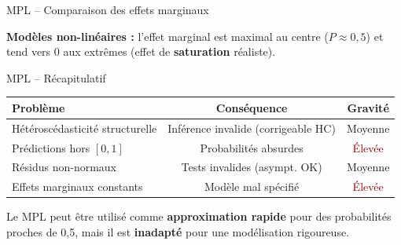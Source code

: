 \documentclass[11pt,aspectratio=169]{beamer}
\begin{document}
\begin{frame}{MPL -- Comparaison des effets marginaux}

\begin{center}
\end{center}

\textbf{Modèles non-linéaires :} l'effet marginal est maximal au centre ($P \approx 0{,}5$) et tend vers 0 aux extrêmes (effet de \textbf{saturation} réaliste).

\end{frame}

\begin{frame}{MPL -- Récapitulatif}

\begin{center}
    \small
    \renewcommand{\arraystretch}{1.3}
    \begin{tabular}{lcc}
        \toprule
        \textbf{Problème} & \textbf{Conséquence} & \textbf{Gravité} \\
        \midrule
        Hétéroscédasticité structurelle & Inférence invalide (corrigeable HC) & Moyenne \\
        Prédictions hors $[0,1]$ & Probabilités absurdes & \textcolor{darkred}{Élevée} \\
        Résidus non-normaux & Tests invalides (asympt. OK) & Moyenne \\
        Effets marginaux constants & Modèle mal spécifié & \textcolor{darkred}{Élevée} \\
        \bottomrule
    \end{tabular}
\end{center}

\vspace{0.5cm}

Le MPL peut être utilisé comme \textbf{approximation rapide} pour des probabilités proches de 0,5, mais il est \textbf{inadapté} pour une modélisation rigoureuse.

\end{frame}
\end{document}
